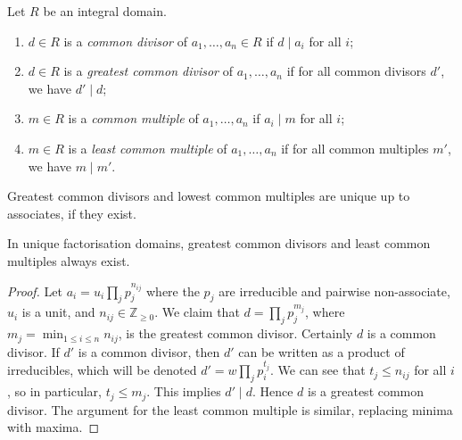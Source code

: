 \begin{definition}
	Let $R$ be an integral domain.
	\begin{enumerate}
		\item $d \in R$ is a \textit{common divisor} of $a_1, \dots, a_n \in R$ if $d \mid a_i$ for all $i$;
		\item $d \in R$ is a \textit{greatest common divisor} of $a_1, \dots, a_n$ if for all common divisors $d'$, we have $d' \mid d$;
		\item $m \in R$ is a \textit{common multiple} of $a_1, \dots, a_n$ if $a_i \mid m$ for all $i$;
		\item $m \in R$ is a \textit{least common multiple} of $a_1, \dots, a_n$ if for all common multiples $m'$, we have $m \mid m'$.
	\end{enumerate}
\end{definition}
\begin{remark}
	Greatest common divisors and lowest common multiples are unique up to associates, if they exist.
\end{remark}
\begin{proposition}
	In unique factorisation domains, greatest common divisors and least common multiples always exist.
\end{proposition}
\begin{proof}
	Let $a_i = u_i \prod_j p_j^{n_{ij}}$ where the $p_j$ are irreducible and pairwise non-associate, $u_i$ is a unit, and $n_{ij} \in \mathbb Z_{\geq 0}$.
	We claim that $d = \prod_j p_j^{m_j}$, where $m_j = \min_{1 \leq i \leq n} n_{ij}$, is the greatest common divisor.
	Certainly $d$ is a common divisor.
	If $d'$ is a common divisor, then $d'$ can be written as a product of irreducibles, which will be denoted $d' = w \prod_j p_i^{t_j}$.
	We can see that $t_j \leq n_{ij}$ for all $i$, so in particular, $t_j \leq m_j$.
	This implies $d' \mid d$.
	Hence $d$ is a greatest common divisor.
	The argument for the least common multiple is similar, replacing minima with maxima.
\end{proof}

